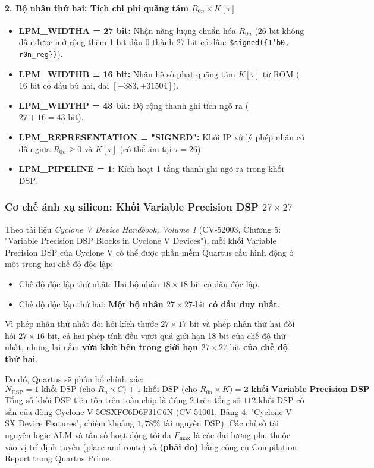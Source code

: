 \paragraph{2. Bộ nhân thứ hai: Tích chi phí quãng tám $R_{0n} \times K[\tau]$}
\begin{itemize}[leftmargin=1.5em, itemsep=2pt]
    \item \textbf{LPM\_WIDTHA = 27 bit:} Nhận năng lượng chuẩn hóa $R_{0n}$ ($26\text{ bit}$ không dấu được mở rộng thêm 1 bit dấu 0 thành $27\text{ bit}$ có dấu: \texttt{\$signed(\{1'b0, r0n\_reg\})}).
    \item \textbf{LPM\_WIDTHB = 16 bit:} Nhận hệ số phạt quãng tám $K[\tau]$ từ ROM ($16\text{ bit}$ có dấu bù hai, dải $[-383, +31504]$).
    \item \textbf{LPM\_WIDTHP = 43 bit:} Độ rộng thanh ghi tích ngõ ra ($27 + 16 = 43\text{ bit}$).
    \item \textbf{LPM\_REPRESENTATION = "SIGNED":} Khối IP xử lý phép nhân có dấu giữa $R_{0n} \ge 0$ và $K[\tau]$ (có thể âm tại $\tau = 26$).
    \item \textbf{LPM\_PIPELINE = 1:} Kích hoạt 1 tầng thanh ghi ngõ ra trong khối DSP.
\end{itemize}

\subsubsection*{Cơ chế ánh xạ silicon: Khối Variable Precision DSP $27 \times 27$}
Theo tài liệu \emph{Cyclone V Device Handbook, Volume 1} (CV-52003, Chương 5: "Variable Precision DSP Blocks in Cyclone V Devices"), mỗi khối Variable Precision DSP của Cyclone V có thể được phần mềm Quartus cấu hình động ở một trong hai chế độ độc lập:
\begin{itemize}[leftmargin=1.5em, itemsep=2pt]
    \item Chế độ độc lập thứ nhất: Hai bộ nhân $18 \times 18\text{-bit}$ có dấu độc lập.
    \item Chế độ độc lập thứ hai: \textbf{Một bộ nhân $27 \times 27\text{-bit}$ có dấu duy nhất}.
\end{itemize}

Vì phép nhân thứ nhất đòi hỏi kích thước $27 \times 17\text{-bit}$ và phép nhân thứ hai đòi hỏi $27 \times 16\text{-bit}$, cả hai phép tính đều vượt quá giới hạn 18 bit của chế độ thứ nhất, nhưng lại nằm \textbf{vừa khít bên trong giới hạn $27 \times 27\text{-bit}$ của chế độ thứ hai}.

Do đó, Quartus sẽ phân bổ chính xác:
\begin{equation}
N_{\text{DSP}} = 1\text{ khối DSP (cho } R_n \times C) + 1\text{ khối DSP (cho } R_{0n} \times K) = \mathbf{2\text{ khối Variable Precision DSP}}
\end{equation}
Tổng số khối DSP tiêu tốn trên toàn chip là đúng $2$ trên tổng số $112\text{ khối DSP}$ có sẵn của dòng Cyclone V 5CSXFC6D6F31C6N (CV-51001, Bảng 4: "Cyclone V SX Device Features", chiếm khoảng $1{,}78\%$ tài nguyên DSP). Các chỉ số tài nguyên logic ALM và tần số hoạt động tối đa $F_{\max}$ là các đại lượng phụ thuộc vào vị trí định tuyến (place-and-route) và \textbf{(phải đo)} bằng công cụ Compilation Report trong Quartus Prime.

